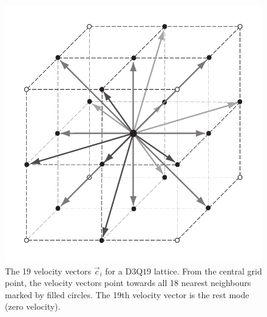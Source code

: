 \begin{figure}[htp]
\begin{center}
  \includegraphics[height=0.3\textheight]{../figs/latticeboltzmann-grid}
  \caption[]{The 19 velocity vectors $\vec{c}_{i}$ for a D$3$Q$19$ lattice. From
  the central grid point, the velocity vectors point towards all 18
  nearest neighbours marked by filled circles. The 19th velocity vector is the
  rest mode (zero velocity).}
  \label{fig:model-d3q18grid}
\end{center}
\end{figure}

